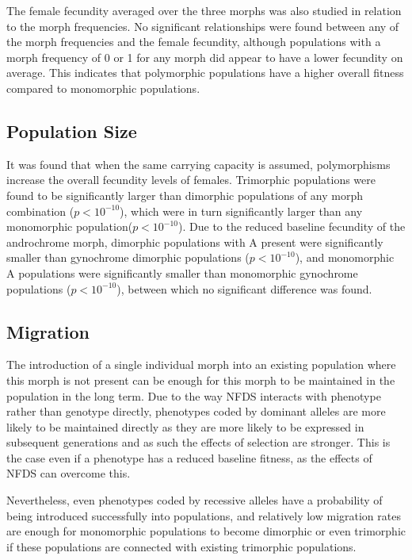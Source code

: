 \documentclass{article}
\begin{document}
The female fecundity averaged over the three morphs was also studied in relation to the morph frequencies. No significant relationships were found between any of the morph frequencies and the female fecundity, although populations with a morph frequency of 0 or 1 for any morph did appear to have a lower fecundity on average. This indicates that polymorphic populations have a higher overall fitness compared to monomorphic populations.

\subsection{Population Size}
It was found that when the same carrying capacity is assumed, polymorphisms increase the overall fecundity levels of females. Trimorphic populations were found to be significantly larger than dimorphic populations of any morph combination ($p<10^{-10}$), which were in turn significantly larger than any monomorphic population($p<10^{-10}$). Due to the reduced baseline fecundity of the androchrome morph, dimorphic populations with A present were significantly smaller than gynochrome dimorphic populations ($p<10^{-10}$), and monomorphic A populations were significantly smaller than monomorphic gynochrome populations ($p<10^{-10}$), between which no significant difference was found.

\subsection{Migration}
The introduction of a single individual morph into an existing population where this morph is not present can be enough for this morph to be maintained in the population in the long term. Due to the way NFDS interacts with phenotype rather than genotype directly, phenotypes coded by dominant alleles are more likely to be maintained directly as they are more likely to be expressed in subsequent generations and as such the effects of selection are stronger. This is the case even if a phenotype has a reduced baseline fitness, as the effects of NFDS can overcome this.

Nevertheless, even phenotypes coded by recessive alleles have a probability of being introduced successfully into populations, and relatively low migration rates are enough for monomorphic populations to become dimorphic or even trimorphic if these populations are connected with existing trimorphic populations.
\end{document}
